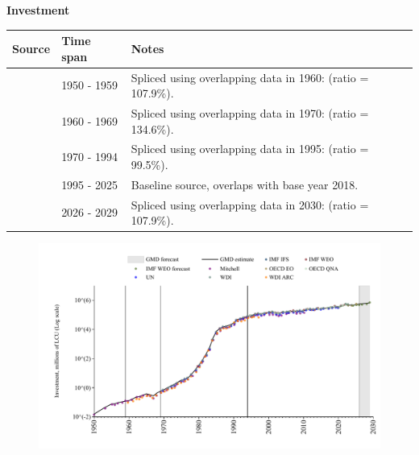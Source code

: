 \documentclass[12pt,a4paper,landscape]{article}
\begin{document}
\begin{adjustbox}{max totalsize={\paperwidth}{\paperheight},center}
\begin{minipage}[t][\textheight][t]{\textwidth}
\vspace*{0.5cm}
{}
\begin{center}
{\Large\bfseries Investment}
\end{center}
\vspace{0.5cm}
\begin{table}[H]
\centering
\small
\begin{tabular}{|l|l|l|}
\hline
\textbf{Source} & \textbf{Time span} & \textbf{Notes} \\
\hline
\rowcolor{white}\cite{Mitchell}& 1950 - 1959 &Spliced using overlapping data in 1960: (ratio = 107.9\%). \\
\rowcolor{lightgray}\cite{WDI_ARC}& 1960 - 1969 &Spliced using overlapping data in 1970: (ratio = 134.6\%). \\
\rowcolor{white}\cite{WDI}& 1970 - 1994 &Spliced using overlapping data in 1995: (ratio = 99.5\%). \\
\rowcolor{lightgray}\cite{OECD_EO}& 1995 - 2025 &Baseline source, overlaps with base year 2018. \\
\rowcolor{white}\cite{IMF_WEO_forecast}& 2026 - 2029 &Spliced using overlapping data in 2030: (ratio = 107.9\%). \\
\hline
\end{tabular}
\end{table}
\begin{figure}[H]
\centering
\includegraphics[width=\textwidth,height=0.6\textheight,keepaspectratio]{graphs/ISR_inv.pdf}
\end{figure}
\end{minipage}
\end{adjustbox}
\end{document}
